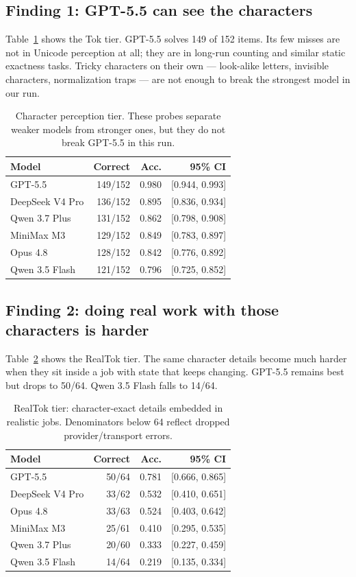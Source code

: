 \documentclass[10pt,twocolumn]{article}
\begin{document}
\subsection{Finding 1: GPT-5.5 can see the characters}
Table~\ref{tab:tok} shows the Tok tier. GPT-5.5 solves 149 of 152 items. Its few misses are not in Unicode perception at all; they are in long-run counting and similar static exactness tasks. Tricky characters on their own --- look-alike letters, invisible characters, normalization traps --- are not enough to break the strongest model in our run.

\begin{table}[t]
\centering
\small
\begin{tabular}{lrrr}
\toprule
Model & Correct & Acc. & 95\% CI \\
\midrule
GPT-5.5 & 149/152 & 0.980 & [0.944, 0.993] \\
DeepSeek V4 Pro & 136/152 & 0.895 & [0.836, 0.934] \\
Qwen 3.7 Plus & 131/152 & 0.862 & [0.798, 0.908] \\
MiniMax M3 & 129/152 & 0.849 & [0.783, 0.897] \\
Opus 4.8 & 128/152 & 0.842 & [0.776, 0.892] \\
Qwen 3.5 Flash & 121/152 & 0.796 & [0.725, 0.852] \\
\bottomrule
\end{tabular}
\caption{Character perception tier. These probes separate weaker models from stronger ones, but they do not break GPT-5.5 in this run.}
\label{tab:tok}
\end{table}

\subsection{Finding 2: doing real work with those characters is harder}
Table~\ref{tab:realtok} shows the RealTok tier. The same character details become much harder when they sit inside a job with state that keeps changing. GPT-5.5 remains best but drops to 50/64. Qwen 3.5 Flash falls to 14/64.

\begin{table}[t]
\centering
\small
\begin{tabular}{lrrr}
\toprule
Model & Correct & Acc. & 95\% CI \\
\midrule
GPT-5.5 & 50/64 & 0.781 & [0.666, 0.865] \\
DeepSeek V4 Pro & 33/62 & 0.532 & [0.410, 0.651] \\
Opus 4.8 & 33/63 & 0.524 & [0.403, 0.642] \\
MiniMax M3 & 25/61 & 0.410 & [0.295, 0.535] \\
Qwen 3.7 Plus & 20/60 & 0.333 & [0.227, 0.459] \\
Qwen 3.5 Flash & 14/64 & 0.219 & [0.135, 0.334] \\
\bottomrule
\end{tabular}
\caption{RealTok tier: character-exact details embedded in realistic jobs. Denominators below 64 reflect dropped provider/transport errors.}
\label{tab:realtok}
\end{table}
\end{document}
